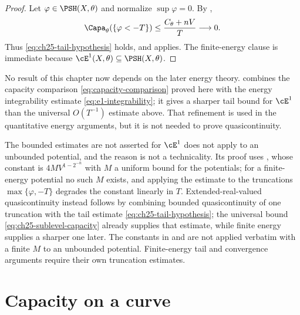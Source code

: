\begin{proof}
Let $\varphi\in\PSH(X,\theta)$ and normalize $\sup\varphi=0$.  By
,
\[
 \Capa_\theta(\{\varphi<-T\})
 \leq\frac{C_\theta+nV}{T}\longrightarrow0.
\]
Thus \eqref{eq:ch25-tail-hypothesis} holds, and
 applies.  The finite-energy clause
is immediate because $\cE^1(X,\theta)\subseteq\PSH(X,\theta)$.
\end{proof}

\begin{remark}
\label{rem:ch25-no-circularity}
No result of this chapter now depends on the later energy theory.
 combines the capacity comparison
\eqref{eq:capacity-comparison} proved here with the energy integrability
estimate \eqref{eq:e1-integrability}; it gives a sharper tail bound for
$\cE^1$ than the universal $O(T^{-1})$ estimate above.  That refinement is
used in the quantitative energy arguments, but it is not needed to prove
quasicontinuity.
\end{remark}

\begin{warning}{The bounded estimates are not asserted for
\texorpdfstring{$\cE^1$}{E1}}
 does not apply to an unbounded potential,
and the reason is not a technicality.  Its proof uses
, whose constant is
$4MV^{1-2^{-n}}$ with $M$ a uniform bound for the potentials; for a
finite-energy potential no such $M$ exists, and applying the estimate to
the truncations $\max\{\varphi,-T\}$ degrades the constant linearly in
$T$.  Extended-real-valued quasicontinuity instead follows by combining
bounded quasicontinuity of one truncation with the tail estimate
\eqref{eq:ch25-tail-hypothesis}; the universal bound
\eqref{eq:ch25-sublevel-capacity} already supplies that estimate, while
finite energy supplies a sharper one later.  The constants in  and
 are not applied verbatim with a
finite $M$ to an unbounded potential.  Finite-energy tail and convergence
arguments require their own truncation estimates.
\end{warning}

\section{Capacity on a curve}
\label{sec:ch25-curves}

